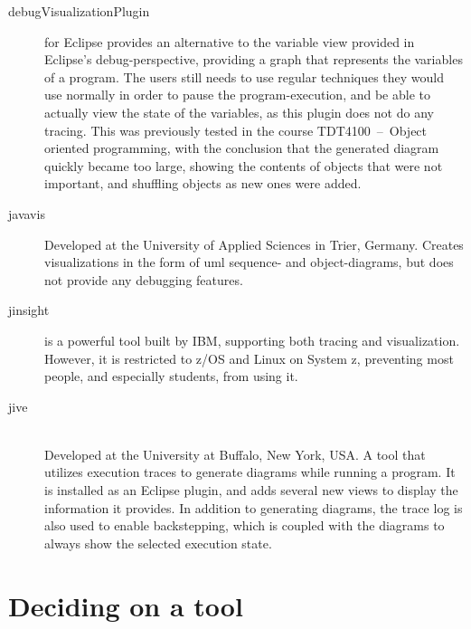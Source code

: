 \begin{description}
\item[\gls{debugVisualizationPlugin}] for Eclipse provides an alternative to the variable view provided in Eclipse's debug-perspective, providing a graph that represents the variables of a program.
The users still needs to use regular techniques they would use normally in order to pause the program-execution, and be able to actually view the state of the variables, as this plugin does not do any tracing.
This was previously tested in the course TDT4100~--~Object oriented programming, with the conclusion that the generated diagram quickly became too large, showing the contents of objects that were not important, and shuffling objects as new ones were added.%

\item[\Gls{javavis}] \cite{Oechsle2002} Developed at the University of Applied Sciences in Trier, Germany.
Creates visualizations in the form of \gls{uml} sequence- and object-diagrams, but does not provide any debugging features.

\item[\Gls{jinsight}] \cite{Pauw} is a powerful tool built by IBM, supporting both tracing and visualization.
However, it is restricted to z/OS and Linux on System z, preventing most people, and especially students, from using it.

\item[\gls{jive}] \cite{Lessaa}\\
Developed at the University at Buffalo, New York, USA.
A tool that utilizes execution traces to generate diagrams while running a program.
It is installed as an Eclipse plugin, and adds several new views to display the information it provides.
In addition to generating diagrams, the trace log is also used to enable backstepping, which is coupled with the diagrams to always show the selected execution state.

\end{description}
\section{Deciding on a tool}\label{preDiscuss}

